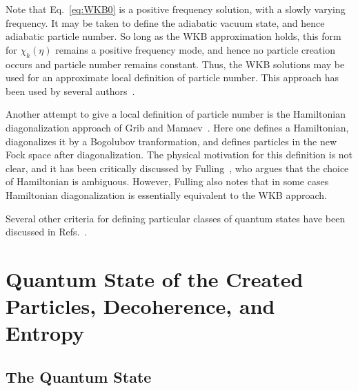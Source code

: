 \documentclass[eqsecnum,floats,aps,prd,floatfix,titlepage,tightenlines]{revtex4}
\begin{document}
Note that Eq.~\eqref{eq:WKB0} is a positive frequency solution, with a slowly varying frequency. It may be taken to define the adiabatic vacuum
state, and hence adiabatic particle number. So long as the WKB approximation holds, this form for $\chi_k(\eta)$ remains a positive frequency mode,
and hence no particle creation occurs and particle number remains constant. Thus, the WKB solutions may be used for an approximate local
definition of particle number. This approach has been used by several authors~\cite{Woodhouse76,Berger78,Azuma83,Winitzki05,Parker12,Agullo15}.

Another attempt to give a local definition of particle number is the Hamiltonian diagonalization approach of Grib and Mamaev~\cite{Grib69}. Here one
defines a Hamiltonian, diagonalizes it by a Bogolubov tranformation, and defines particles in the new Fock space after diagonalization. The physical
motivation for this definition is not clear, and it has been critically discussed by Fulling~\cite{Fulling79}, who argues that the choice of Hamiltonian
is ambiguous. However, Fulling also notes that in some cases Hamiltonian diagonalization is essentially equivalent to the WKB approach. 

Several other criteria for defining particular classes of quantum states have been discussed in Refs.~\cite{Dray83,Degner,AP-Lim03,Raine75}.
 

\section{Quantum State of the Created Particles, Decoherence, and Entropy}
\label{sec:state-entropy}

\subsection{The Quantum State}
\label{sec:state}
\end{document}
